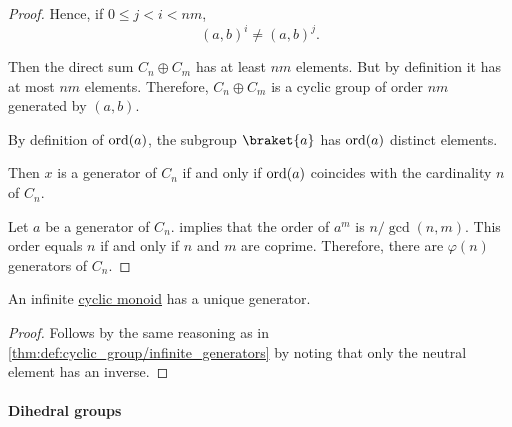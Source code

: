 \begin{proof}
  Hence, if \( 0 \leq j < i < nm \),
  \begin{equation*}
    (a, b)^i \neq (a, b)^j.
  \end{equation*}

  Then the direct sum \( C_n \oplus C_m \) has at least \( nm \) elements. But by definition it has at most \( nm \) elements. Therefore, \( C_n \oplus C_m \) is a cyclic group of order \( nm \) generated by \( (a, b) \).

   By definition of \( \operatorname{ord}(a) \), the subgroup \( \braket{ a } \) has \( \operatorname{ord}(a) \) distinct elements.

  Then \( x \) is a generator of \( C_n \) if and only if \( \operatorname{ord}(a) \) coincides with the cardinality \( n \) of \( C_n \).

   Let \( a \) be a generator of \( C_n \).  implies that the order of \( a^m \) is \( n / \gcd(n, m) \). This order equals \( n \) if and only if \( n \) and \( m \) are coprime. Therefore, there are \( \varphi(n) \) generators of \( C_n \).
\end{proof}

\begin{corollary}\label{thm:infinite_cyclic_monoid_generator}
  An infinite \hyperref[def:cyclic_monoid]{cyclic monoid} has a unique generator.
\end{corollary}
\begin{proof}
  Follows by the same reasoning as in \cref{thm:def:cyclic_group/infinite_generators} by noting that only the neutral element has an inverse.
\end{proof}

\paragraph{Dihedral groups}

